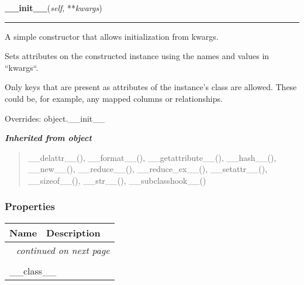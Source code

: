\hspace{.8\funcindent}\begin{boxedminipage}{\funcwidth}

    \raggedright \textbf{\_\_init\_\_}(\textit{self}, **\textit{kwargs})

    \vspace{-1.5ex}

    \rule{\textwidth}{0.5\fboxrule}
\setlength{\parskip}{2ex}
    A simple constructor that allows initialization from kwargs.

    Sets attributes on the constructed instance using the names and values 
    in ``kwargs``.

    Only keys that are present as attributes of the instance's class are 
    allowed. These could be, for example, any mapped columns or 
    relationships.

\setlength{\parskip}{1ex}
      Overrides: object.\_\_init\_\_

    \end{boxedminipage}


\large{\textbf{\textit{Inherited from object}}}

\begin{quote}
\_\_delattr\_\_(), \_\_format\_\_(), \_\_getattribute\_\_(), \_\_hash\_\_(), \_\_new\_\_(), \_\_reduce\_\_(), \_\_reduce\_ex\_\_(), \_\_setattr\_\_(), \_\_sizeof\_\_(), \_\_str\_\_(), \_\_subclasshook\_\_()
\end{quote}


  \subsubsection{Properties}

    \vspace{-1cm}
\hspace{\varindent}\begin{longtable}{|p{\varnamewidth}|p{\vardescrwidth}|l}
\cline{1-2}
\cline{1-2} \centering \textbf{Name} & \centering \textbf{Description}& \\
\cline{1-2}
\endhead\cline{1-2}\multicolumn{3}{r}{\small\textit{continued on next page}}\\\endfoot\cline{1-2}
\endlastfoot\multicolumn{2}{|l|}{\textit{Inherited from object}}\\
\multicolumn{2}{|p{\varwidth}|}{\raggedright \_\_class\_\_}\\
\cline{1-2}
\end{longtable}


